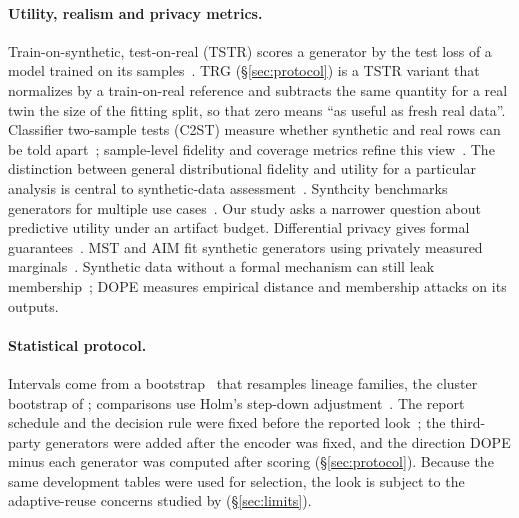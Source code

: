 \paragraph{Utility, realism and privacy metrics.}
Train-on-synthetic, test-on-real (TSTR) scores a generator by the test loss of a model trained on its samples~\citep{esteban2017tstr}.
TRG (\S\ref{sec:protocol}) is a TSTR variant that normalizes by a train-on-real reference and subtracts the same quantity for a real twin the size of the fitting split, so that zero means ``as useful as fresh real data''.
Classifier two-sample tests (C2ST) measure whether synthetic and real rows can be told apart~\citep{lopezpaz2017c2st}; sample-level fidelity and coverage metrics refine this view~\citep{alaa2022faithful}.
The distinction between general distributional fidelity and utility for a particular analysis is central to synthetic-data assessment~\citep{snoke2018utility}. Synthcity benchmarks generators for multiple use cases~\citep{qian2023synthcity}. Our study asks a narrower question about predictive utility under an artifact budget.
Differential privacy gives formal guarantees~\citep{dwork2006calibrating}. MST and AIM fit synthetic generators using privately measured marginals~\citep{mckenna2021mst,mckenna2022aim}. Synthetic data without a formal mechanism can still leak membership~\citep{shokri2017membership,stadler2022groundhog}; DOPE measures empirical distance and membership attacks on its outputs.

\paragraph{Statistical protocol.}
Intervals come from a bootstrap~\citep{efron1979bootstrap} that resamples lineage families, the cluster bootstrap of \citet{davison1997bootstrap}; comparisons use Holm's step-down adjustment~\citep{holm1979simple}.
The report schedule and the decision rule were fixed before the reported look~\citep{nosek2018preregistration}; the third-party generators were added after the encoder was fixed, and the direction DOPE minus each generator was computed after scoring (\S\ref{sec:protocol}).
Because the same development tables were used for selection, the look is subject to the adaptive-reuse concerns studied by \citet{dwork2015reusable} (\S\ref{sec:limits}).
